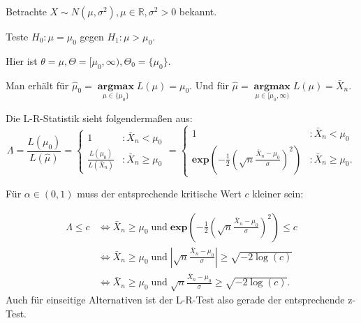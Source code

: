 \documentclass[10pt]{article}
\newcommand{\IR}{\mathbb{R}} %
\newenvironment{BSP}[1][]
{\begin{Beispiel}[frametitle=#1]}{\end{Beispiel}}
\begin{document}
	\begin{BSP}[Beispiel 2.1.2 (z-Test mit einseitiger Alternative)]
		Betrachte $X \sim N(\mu, \sigma^2), \mu \in \IR, \sigma^2 >0$ bekannt.
		
		Teste $H_0: \mu = \mu_0$ gegen $H_1: \mu > \mu_0$.
		
		Hier ist $\theta = \mu, \Theta = [\mu_0, \infty), \Theta_0 = \{\mu_0\}$.
		
		Man erhält für $\hat{\mu}_0 = \;\underset{\mu \in \{\mu_0\}}{\textbf{argmax}} \; L(\mu) = \mu_0$.
		Und für $\hat{\mu} = \;\underset{\mu \in [\mu_0, \infty)}{\textbf{argmax}} \; L(\mu) = \bar{X}_n$.
		
		Die L-R-Statistik sieht folgendermaßen aus:
		\begin{equation*}
			\Lambda = \frac{L(\mu_0)}{L(\hat{\mu})} = \begin{cases}
				1 &: \bar{X}_n < \mu_0\\
				\frac{L(\mu_0)}{L(\bar{X}_n)} &: \bar{X}_n \geq \mu_0
			\end{cases}
			= \begin{cases}
				1 &: \bar{X}_n < \mu_0\\
				\textbf{exp} \left(- \frac{1}{2}\left(\sqrt{n} \frac{\bar{X}_n - \mu_0}{\sigma}\right)^2\right) &: \bar{X}_n \geq \mu_0.
			\end{cases}
		\end{equation*}
		
		Für $\alpha \in (0,1)$ muss der entsprechende kritische Wert $c$ kleiner sein:
		
		\begin{equation*}
			\begin{split}
				\Lambda \leq c &\Leftrightarrow \bar{X}_n \geq \mu_0 \; \text{und} \; \textbf{exp}\left(-\frac{1}{2}\left(\sqrt{n} \frac{\bar{X}_n - \mu_0}{\sigma}\right)^2\right) \leq c\\
				&\Leftrightarrow \bar{X}_n \geq \mu_0 \; \text{und} \; \left\vert \sqrt{n} \frac{\bar{X}_n - \mu_0}{\sigma} \right\vert \geq \sqrt{-2 \log(c)} \\
				&\Leftrightarrow \bar{X}_n \geq \mu_0 \; \text{und} \; \sqrt{n} \frac{\bar{X}_n - \mu_0}{\sigma} \geq \sqrt{-2 \log(c)}.
			\end{split}
		\end{equation*}
		Auch für einseitige Alternativen ist der L-R-Test also gerade der entsprechende z-Test. 
	\end{BSP}
	
\end{document}
